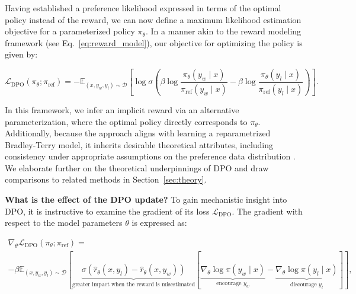 Having established a preference likelihood expressed in terms of the optimal policy instead of the reward, we can now define a maximum likelihood estimation objective for a parameterized policy $\pi_\theta$. In a manner akin to the reward modeling framework (see Eq.~\ref{eq:reward_model}), our objective for optimizing the policy is given by:

\begin{equation}\label{eq:optimum_model}
    \mathcal{L}_\text{DPO}(\pi_{\theta}; \pi_\text{ref}) = -\mathbb{E}_{(x, y_w, y_l)\sim \mathcal{D}}\left[\log \sigma \left(\beta \log \frac{\pi_{\theta}(y_w\mid x)}{\pi_\text{ref}(y_w\mid x)} - \beta \log \frac{\pi_{\theta}(y_l\mid x)}{\pi_\text{ref}(y_l\mid x)}\right)\right].
\end{equation}

In this framework, we infer an implicit reward via an alternative parameterization, where the optimal policy directly corresponds to $\pi_\theta$. Additionally, because the approach aligns with learning a reparametrized Bradley-Terry model, it inherits desirable theoretical attributes, including consistency under appropriate assumptions on the preference data distribution \cite{bong2022generalized}. We elaborate further on the theoretical underpinnings of DPO and draw comparisons to related methods in Section~\ref{sec:theory}.

\textbf{What is the effect of the DPO update?} To gain mechanistic insight into DPO, it is instructive to examine the gradient of its loss $\mathcal{L}_\text{DPO}$. The gradient with respect to the model parameters $\theta$ is expressed as:

\begin{multline*}\label{eq:gradient}
    \nabla_\theta \mathcal{L}_\text{DPO}(\pi_\theta;\pi_\text{ref}) = \\ -\beta\mathbb{E}_{(x, y_w, y_l) \sim \mathcal{D}} \left[\underbrace{\sigma(\hat{r}_\theta(x, y_l) - \hat{r}_\theta (x, y_w))}_{\text{greater impact when the reward is misestimated}}\left[\underbrace{\nabla_\theta\log \pi(y_w \mid x)}_{\text{encourage $y_w$}} - \underbrace{\nabla_\theta\log\pi(y_l \mid x)}_{\text{discourage $y_l$}}\right]\right],
\end{multline*}

